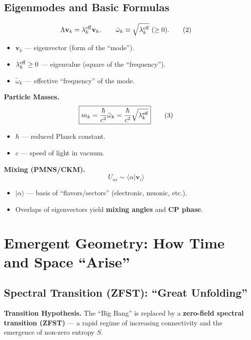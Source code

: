 \documentclass[12pt,a4paper]{article}
\begin{document}
\subsection{Eigenmodes and Basic Formulas}
\[
\Lambda \mathbf{v}_k = \lambda_k^{\rm eff} \mathbf{v}_k, \qquad
\tilde{\omega}_k \equiv \sqrt{\lambda_k^{\rm eff}} \ (\ge 0). \tag{2}
\]

\begin{itemize}
    \item \(\mathbf{v}_k\) — eigenvector (form of the ``mode'').
    \item \(\lambda_k^{\rm eff} \ge 0\) — eigenvalue (square of the ``frequency'').
    \item \(\tilde{\omega}_k\) — effective ``frequency'' of the mode.
\end{itemize}

\textbf{Particle Masses.}
\[
\boxed{m_k = \frac{\hbar}{c^2} \tilde{\omega}_k = \frac{\hbar}{c^2} \sqrt{\lambda_k^{\rm eff}}} \tag{3}
\]
\begin{itemize}
    \item \(\hbar\) — reduced Planck constant.
    \item \(c\) — speed of light in vacuum.
\end{itemize}

\textbf{Mixing (PMNS/CKM).}
\[
\boxed{U_{\alpha i} \sim \langle \alpha | \mathbf{v}_i \rangle} \tag{4}
\]
\begin{itemize}
    \item \(|\alpha\rangle\) — basis of ``flavors/sectors'' (electronic, muonic, etc.).
    \item Overlaps of eigenvectors yield \textbf{mixing angles} and \textbf{CP phase}.
\end{itemize}

\section{Emergent Geometry: How Time and Space ``Arise''}

\subsection{Spectral Transition (ZFST): ``Great Unfolding''}
\textbf{Transition Hypothesis.} The ``Big Bang'' is replaced by a \textbf{zero-field spectral transition (ZFST)} — a rapid regime of increasing connectivity and the emergence of non-zero entropy \(S\).
\end{document}
